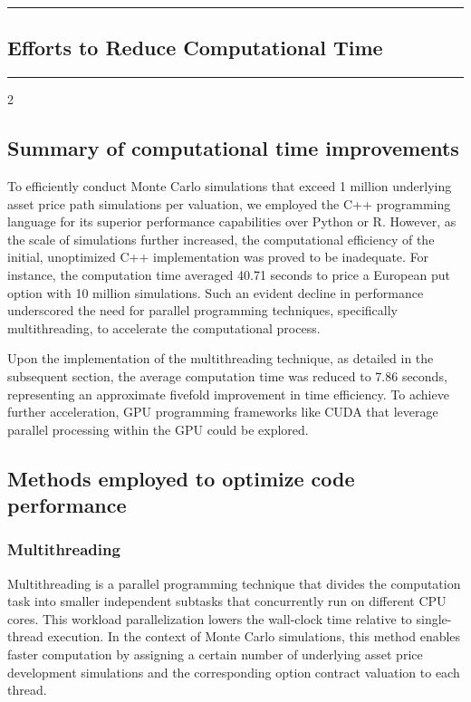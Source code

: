 {\color{gray}\hrule}
\begin{center}
\section{Efforts to Reduce Computational Time}
\bigskip
\end{center}
{\color{gray}\hrule}
\begin{multicols}{2}
\subsection{Summary of computational time improvements}
To efficiently conduct Monte Carlo simulations that exceed 1 million underlying asset price path simulations per valuation, we employed the C++ programming language for its superior performance capabilities over Python or R. However, as the scale of simulations further increased, the computational efficiency of the initial, unoptimized C++ implementation was proved to be inadequate. For instance, the computation time averaged 40.71 seconds to price a European put option with 10 million simulations. Such an evident decline in performance underscored the need for parallel programming techniques, specifically multithreading, to accelerate the computational process.

Upon the implementation of the multithreading technique, as detailed in the subsequent section, the average computation time was reduced to 7.86 seconds, representing an approximate fivefold improvement in time efficiency. To achieve further acceleration, GPU programming frameworks like CUDA that leverage parallel processing within the GPU could be explored.
\subsection{Methods employed to optimize code performance}
\subsubsection{Multithreading}
Multithreading is a parallel programming technique that divides the computation task into smaller independent subtasks that concurrently run on different CPU cores. This workload parallelization lowers the wall-clock time relative to single-thread execution. In the context of Monte Carlo simulations, this method enables faster computation by assigning a certain number of underlying asset price development simulations and the corresponding option contract valuation to each thread.


\end{multicols}
